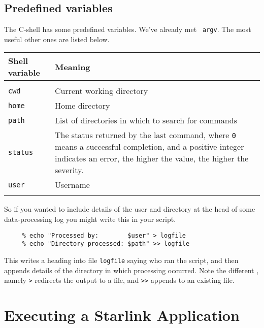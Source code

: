 \subsection{Predefined variables
\label{sc4_se_predefined}}

The C-shell has some predefined variables.  We've already met {\tt
argv}.  The most useful other ones are listed below.

\begin{center}
\begin{tabular}{lp{100mm}}
Shell variable & Meaning \\ \hline
\\
{\tt cwd}      & Current working directory \\
{\tt home}     & Home directory \\
{\tt path}     & List of directories in which to search for commands \\
{\tt status}   & The status returned by the last command, where {\tt 0}
                 means a successful completion, and a positive integer
                 indicates an error, the higher the value, the higher
                 the severity. \\
{\tt user}     & Username \\
\\ \hline
\end{tabular}
\end{center}

So if you wanted to include details of the user and directory at the
head of some data-processing log you might write this in your script.

\small
\begin{verbatim}
     % echo "Processed by:        $user" > logfile
     % echo "Directory processed: $path" >> logfile
\end{verbatim}
\normalsize
This writes a heading into file {\tt logfile} saying who ran the
script, and then appends details of the directory in which processing
occurred. Note the different ,
namely {\tt >} redirects the output to a file, and {\tt >>} appends to
an existing file.

\newpage
\section{Executing a Starlink Application
\label{sc4_se_starlink_app}}

